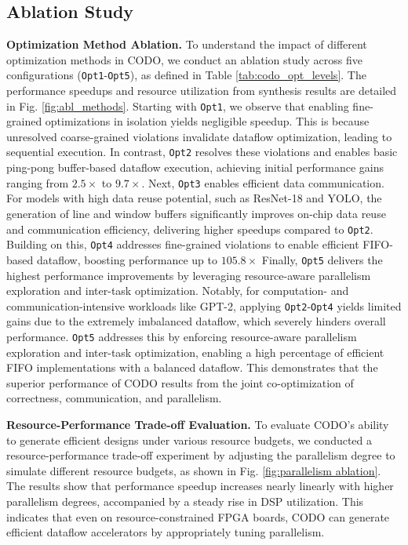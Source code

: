 \documentclass[conference]{IEEEtran}
\begin{document}
\subsection{Ablation Study}
\textbf{Optimization Method Ablation.}
To understand the impact of different optimization methods in CODO, we conduct an ablation study across five configurations (\texttt{Opt1}-\texttt{Opt5}), as defined in Table \ref{tab:codo_opt_levels}. The performance speedups and resource utilization from synthesis results are detailed in Fig. \ref{fig:abl_methods}. Starting with \texttt{Opt1}, we observe that enabling fine-grained optimizations in isolation yields negligible speedup. This is because unresolved coarse-grained violations invalidate dataflow optimization, leading to sequential execution. In contrast, \texttt{Opt2} resolves these violations and enables basic ping-pong buffer-based dataflow execution, achieving initial performance gains ranging from $2.5\times$ to $9.7\times$.
Next, \texttt{Opt3} enables efficient data communication. For models with high data reuse potential, such as ResNet-18 and YOLO, the generation of line and window buffers significantly improves on-chip data reuse and communication efficiency, delivering higher speedups compared to \texttt{Opt2}. Building on this, \texttt{Opt4} addresses fine-grained violations to enable efficient FIFO-based dataflow, boosting performance up to $105.8\times$
Finally, \texttt{Opt5} delivers the highest performance improvements by leveraging resource-aware parallelism exploration and inter-task optimization. Notably, for computation- and communication-intensive workloads like GPT-2, applying \texttt{Opt2}-\texttt{Opt4} yields limited gains due to the extremely imbalanced dataflow, which severely hinders overall performance.  \texttt{Opt5} addresses this by enforcing resource-aware parallelism exploration and inter-task optimization, enabling a high percentage of efficient FIFO implementations with a balanced dataflow. This demonstrates that the superior performance of CODO results from the joint co-optimization of correctness, communication, and parallelism.




\textbf{Resource-Performance Trade-off Evaluation.} To evaluate CODO's ability to generate efficient designs under various resource budgets, we conducted a resource-performance trade-off experiment by adjusting the parallelism degree to simulate different resource budgets, as shown in Fig. \ref{fig:parallelism ablation}. The results show that performance speedup increases nearly linearly with higher parallelism degrees, accompanied by a steady rise in DSP utilization. This indicates that even on resource-constrained FPGA boards, CODO can generate efficient dataflow accelerators by appropriately tuning parallelism.
\end{document}
